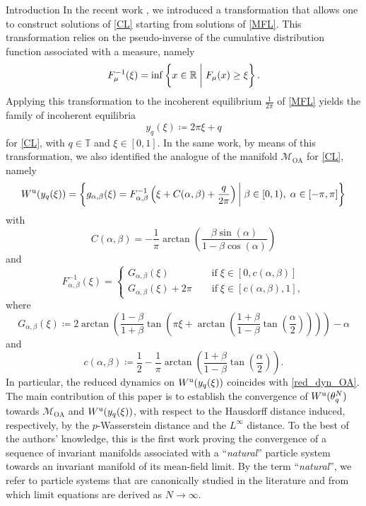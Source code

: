 \documentclass{article}
\theoremstyle{definition}
\renewcommand{\inf}{\mathop{\mathrm{inf}\vphantom{\mathrm{sup}}}}
\newcommand{\R}{\mathbb{R}}
\newcommand{\T}{\mathbb{T}}
\renewcommand{\u}{\textnormal{u}}
\newcommand{\OA}{\mathcal{M}_{\mathrm{OA}}}
\begin{document}
\begin{section}{Introduction}
In the recent work \cite{kuehn2025mean}, we introduced a transformation that allows one to construct solutions of \eqref{CL} starting from solutions of \eqref{MFL}. This transformation relies on the pseudo-inverse of the cumulative distribution function associated with a measure, namely
$$F^{-1}_\mu(\xi)=\inf\left\{x\in\R\;\bigg\vert\; F_\mu(x)\geq\xi\right\}.$$
Applying this transformation to the incoherent equilibrium $\frac{1}{2\pi}$ of \eqref{MFL} yields the family of incoherent equilibria
$$y_q(\xi)\coloneqq2\pi\xi+q$$
for \eqref{CL}, with $q\in\T$ and $\xi\in[0,1]$. In the same work, by means of this transformation, we also identified the analogue of the manifold $\OA$ for \eqref{CL}, namely
\begin{equation}\label{CL_OA_Man}
     W^\u(y_q(\xi))=\left\{g_{\alpha,\beta}(\xi)=F^{-1}_{\alpha,\beta}\left(\xi+C(\alpha,\beta)+\frac{q}{2\pi}\right)\bigg\vert\;\beta\in[0,1),\;\alpha\in[-\pi,\pi]\right\}
\end{equation}
with
$$C(\alpha,\beta)=-\frac{1}{\pi}\arctan\left(\frac{\beta\sin(\alpha)}{1-\beta\cos(\alpha)}\right)$$
and
\begin{equation}\label{inv_CDF_1}
     F^{-1}_{\alpha,\beta}(\xi)=\begin{cases}
        G_{\alpha,\beta}(\xi)\qquad\qquad\; \text{if}\;\xi\in[0,c(\alpha,\beta)]\\
        G_{\alpha,\beta}(\xi)+2\pi\qquad \text{if}\;\xi\in[c(\alpha,\beta),1],
    \end{cases}
\end{equation}
where
\begin{equation}\label{inv_CDF_2}
    G_{\alpha,\beta}(\xi)\coloneqq2\arctan\left(\frac{1-\beta}{1+\beta}\tan\left(\pi\xi+\arctan\left(\frac{1+\beta}{1-\beta}\tan\left(\frac{\alpha}{2}\right)\right)\right)\right)-\alpha
\end{equation}
and
$$c(\alpha,\beta)\coloneqq\frac{1}{2}-\frac{1}{\pi}\arctan\left(\frac{1+\beta}{1-\beta}\tan\left(\frac{\alpha}{2}\right)\right).$$
In particular, the reduced dynamics on $W^\u(y_q(\xi))$ coincides with \eqref{red_dyn_OA}.\\

The main contribution of this paper is to establish the convergence of $W^\u(\theta^N_q)$ towards $\OA$ and $W^\u(y_q(\xi))$, with respect to the Hausdorff distance induced, respectively, by the $p$-Wasserstein distance and the $L^\infty$ distance. To the best of the authors’ knowledge, this is the first work proving the convergence of a sequence of invariant manifolds associated with a ``\textit{natural}'' particle system towards an invariant manifold of its mean-field limit. By the term ``\textit{natural}'', we refer to particle systems that are canonically studied in the literature and from which limit equations are derived as $N\to\infty$.\\


\end{section}
\end{document}
